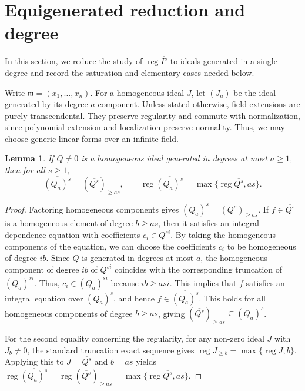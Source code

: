\documentclass[12pt]{amsart}
\numberwithin{equation}{section}
\newtheorem{lemma}[theorem]{Lemma}
\theoremstyle{definition}
\theoremstyle{remark}
\numberwithin{equation}{section}
\DeclareMathOperator{\reg}{reg}
\newcommand{\m}{\mathfrak m}
\begin{document}
\section{Equigenerated reduction and degree}
\label{sec:equigenerat}

In this section, we reduce the study of $\reg\overline{I^s}$ to ideals generated in a single degree and record the saturation and elementary cases needed below.

Write $\m=(x_1,\ldots,x_n)$. For a homogeneous ideal $J$, let $(J_a)$ be the ideal generated by its degree-$a$ component. Unless stated otherwise, field extensions are purely transcendental. They preserve regularity and commute with normalization, since polynomial extension and localization preserve normality. Thus, we may choose generic linear forms over an infinite field.


\begin{lemma}\label{lem:truncation}
If $Q\ne0$ is  a homogeneous ideal  generated in degrees at most $a\ge1$, then  for all $s\ge1$, 
\[
 \overline{(Q_a)^s}=(\overline{Q^s})_{\ge as},\qquad
 \reg\overline{(Q_a)^s}=\max\{\reg\overline{Q^s},as\}.
\]
\end{lemma}
\begin{proof}
Factoring homogeneous   components gives $(Q_a)^s=(Q^s)_{\ge as}$. If $f\in\overline{Q^s}$ is a  homogeneous  element of degree $b\ge as$, then  it satisfies an integral dependence equation with coefficients $c_i \in Q^{si}$.
By taking the homogeneous components of the equation, we can choose the coefficients $c_i$ to be homogeneous of degree $ib$. Since $Q$
is generated in degrees at most $a$, the homogeneous component of degree $ib$ of $Q^{si}$ coincides with the corresponding truncation of $(Q_a)^{si}$. Thus, $c_i \in (Q_a)^{si}$ because $ib \ge asi$. This implies that $f$ satisfies an integral equation over $(Q_a)^s$, and hence $f \in \overline{(Q_a)^s}$. This holds for all homogeneous components of degree $b \ge as$, giving $(\overline{Q^s})_{\ge as} \subseteq \overline{(Q_a)^s}$.

For the second equality concerning the regularity, for any non-zero ideal $J$ with $J_b \ne 0$, the standard truncation exact sequence gives $\reg J_{\ge b}=\max\{\reg J,b\}$. Applying this to $J=\overline{Q^s}$ and $b=as$ yields $\reg\overline{(Q_a)^s} = \reg(\overline{Q^s})_{\ge as} = \max\{\reg\overline{Q^s},as\}$.
\end{proof}
\end{document}
